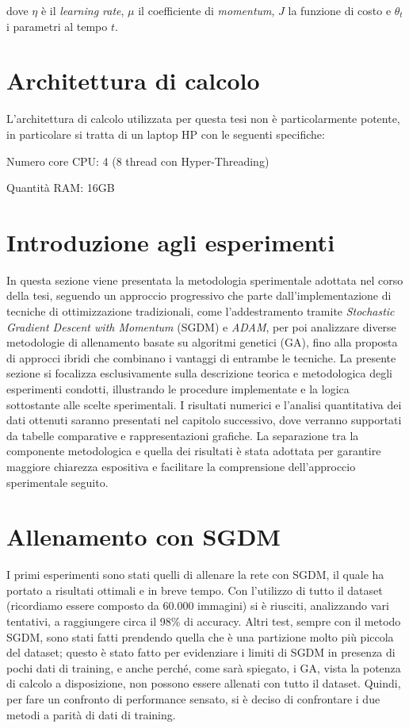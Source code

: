 dove $\eta$ è il \textit{learning rate}, $\mu$ il coefficiente di \textit{momentum}, $J$ la funzione di costo e $\theta_t$ i parametri al tempo $t$.


\section{Architettura di calcolo}

    L'architettura di calcolo utilizzata per questa tesi non è particolarmente potente, in particolare si tratta di un laptop HP con le seguenti specifiche:
    \begin{compactitemize}
        \item Numero core CPU: 4 (8 thread con Hyper-Threading)
        \item Quantità RAM: 16GB
    \end{compactitemize}


\section{Introduzione agli esperimenti}    
In questa sezione viene presentata la metodologia sperimentale adottata nel corso della tesi, seguendo un approccio progressivo che parte dall'implementazione di tecniche di ottimizzazione tradizionali, come l'addestramento tramite \textit{Stochastic Gradient Descent with Momentum} (SGDM) e \textit{ADAM}, per poi analizzare diverse metodologie di allenamento basate su algoritmi genetici (GA), fino alla proposta di approcci ibridi che combinano i vantaggi di entrambe le tecniche.
La presente sezione si focalizza esclusivamente sulla descrizione teorica e metodologica degli esperimenti condotti, illustrando le procedure implementate e la logica sottostante alle scelte sperimentali. I risultati numerici e l'analisi quantitativa dei dati ottenuti saranno presentati nel capitolo successivo, dove verranno supportati da tabelle comparative e rappresentazioni grafiche.
La separazione tra la componente metodologica e quella dei risultati è stata adottata per garantire maggiore chiarezza espositiva e facilitare la comprensione dell'approccio sperimentale seguito.


\section{Allenamento con SGDM}

    I primi esperimenti sono stati quelli di allenare la rete con SGDM, il quale ha portato a risultati ottimali e in breve tempo. Con
    l'utilizzo di tutto il dataset (ricordiamo essere composto da 60.000 immagini) si è riusciti, analizzando vari tentativi, a raggiungere circa il 98\% di accuracy.
    Altri test, sempre con il metodo SGDM, sono stati fatti prendendo quella che è una partizione molto più piccola del dataset; questo è stato fatto per evidenziare
    i limiti di SGDM in presenza di pochi dati di training, e anche perché, come sarà spiegato, i GA, vista la potenza di calcolo a disposizione, non possono essere 
    allenati con tutto il dataset. Quindi, per fare un confronto di performance sensato, si è deciso di confrontare i due metodi a parità di dati di training.

